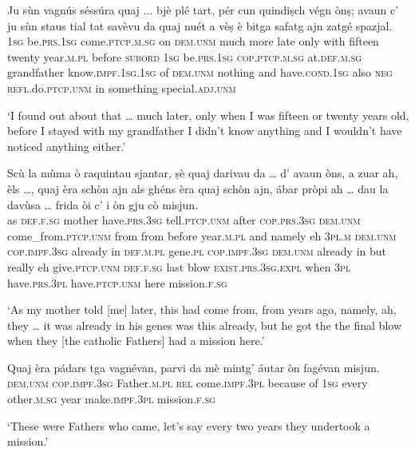 \begin{linenumbers}
\gll  Ju sùn vagnús séssúra quaj ... bjè plé tart, pér cun quindiṣch végn ònṣ; avaun c’ ju sùn staus tial tat savèvu da quaj nuét a vèṣ è bitga safatg ajn zatgé spazjal.\\
  \textsc{1sg} be.\textsc{prs.1sg} come.\textsc{ptcp.m.sg} on \textsc{dem.unm} {} much more late only with fifteen twenty year.\textsc{m.pl} before \textsc{subord} \textsc{1sg} be.\textsc{prs.1sg} \textsc{cop.ptcp.m.sg} at.\textsc{def.m.sg} grandfather know.\textsc{impf.1sg.1sg} of \textsc{dem.unm} nothing and have.\textsc{cond.1sg} also \textsc{neg} \textsc{refl.}do.\textsc{ptcp.unm} in something special.\textsc{adj.unm}\\
\end{linenumbers}
\medskip
\glt `I found out about that … much later, only when I was fifteen or twenty years old, before I stayed with my grandfather I didn’t know anything and I wouldn’t have noticed anything either.'
\medskip

\begin{linenumbers}
\gll  Scù la mùma ò raquintau sjantar, ṣè quaj darivau da … d’ avaun òns, a zuar ah, èls …, quaj èra schòn ajn als ghéns èra quaj schòn ajn, ábar pròpi ah … dau la davùsa … frida òi c’ i òn gju cò misjun.  \\
as \textsc{def.f.sg} mother have.\textsc{prs.3sg} tell.\textsc{ptcp.unm} after \textsc{cop.prs.3sg} \textsc{dem.unm} come\_from.\textsc{ptcp.unm} from {} from before year.\textsc{m.pl} and namely eh \textsc{3pl.m} {} \textsc{dem.unm} \textsc{cop.impf.3sg} already in \textsc{def.m.pl} gene.\textsc{pl} \textsc{cop.impf.3sg} \textsc{dem.unm} already in but really eh {} give.\textsc{ptcp.unm} \textsc{def.f.sg} last {} blow  \textsc{exist.prs.3sg.expl} when \textsc{3pl} have.\textsc{prs.3pl} have.\textsc{ptcp.unm} here mission.\textsc{f.sg}  \\
\end{linenumbers}
\medskip
\glt `As my mother told [me] later, this had  come from, from years ago, namely, ah, they … it was already in his genes was this already, but he got the the final blow when they [the catholic Fathers] had a mission here.'
\medskip

\begin{linenumbers}
\gll   Quaj èra pádars tga vagnévan, parvi da mè mintg’ áutar òn fagévan misjun. \\
  \textsc{dem.unm} \textsc{cop.impf.3sg} Father.\textsc{m.pl} \textsc{rel} come.\textsc{impf.3pl} because of \textsc{1sg} every other.\textsc{m.sg} year make.\textsc{impf.3pl} mission.\textsc{f.sg} \\
\end{linenumbers}
\medskip
\glt `These were Fathers who came, let’s say every two years they undertook a mission.'
\medskip

